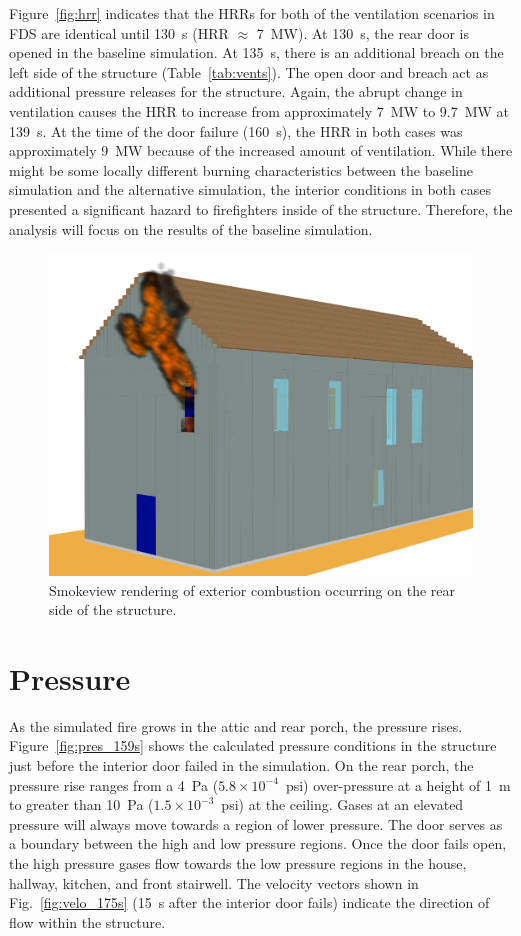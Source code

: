 \documentclass[12pt,oneside]{book}
\begin{document}
Figure~\ref{fig:hrr} indicates that the HRRs for both of the ventilation scenarios in FDS are identical until 130~s (HRR $\approx$ 7~MW). At 130~s, the rear door is opened in the baseline simulation. At 135~s, there is an additional breach on the left side of the structure (Table~\ref{tab:vents}). The open door and breach act as additional pressure releases for the structure. Again, the abrupt change in ventilation causes the HRR to increase from approximately 7~MW to 9.7~MW at 139~s. At the time of the door failure (160~s), the HRR in both cases was approximately 9~MW because of the increased amount of ventilation. While there might be some locally different burning characteristics between the baseline simulation and the alternative simulation, the interior conditions in both cases presented a significant hazard to firefighters inside of the structure. Therefore, the analysis will focus on the results of the baseline simulation.

\begin{figure}[!ht]
\centering
\includegraphics[width=.675\textwidth]{../Figures/smv_exterior_fire}
\caption{Smokeview rendering of exterior combustion occurring on the rear side of the structure.}
\label{fig:smv_ext_fire}
\end{figure}


\clearpage


\section{Pressure}

As the simulated fire grows in the attic and rear porch, the pressure rises. Figure~\ref{fig:pres_159s} shows the calculated pressure conditions in the structure just before the interior door failed in the simulation. On the rear porch, the pressure rise ranges from a 4~Pa ($5.8 \times 10^{-4}$~psi) over-pressure at a height of 1~m to greater than 10~Pa ($1.5 \times 10^{-3}$~psi) at the ceiling. Gases at an elevated pressure will always move towards a region of lower pressure. The door serves as a boundary between the high and low pressure regions. Once the door fails open, the high pressure gases flow towards the low pressure regions in the house, hallway, kitchen, and front stairwell. The velocity vectors shown in Fig.~\ref{fig:velo_175s} (15~s after the interior door fails) indicate the direction of flow within the structure.
\end{document}
